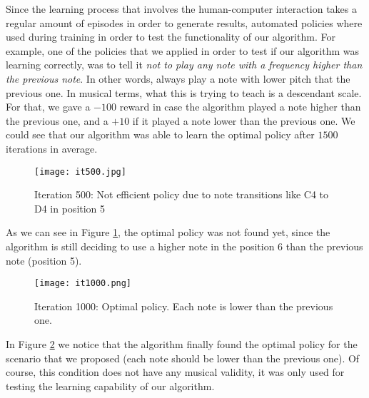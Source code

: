 Since the learning process that involves the human-computer interaction takes a regular amount of episodes in order to generate results, automated policies where used during training in order to test the functionality of our algorithm. For example, one of the policies that we applied in order to test if our algorithm was learning correctly, was to tell it \emph{not to play any note with a frequency higher than the previous note}. In other words, always play a note with lower pitch that the previous one. In musical terms, what this is trying to teach is a descendant scale. For that, we gave a $ -100 $ reward in case the algorithm played a note higher than the previous one, and a $ +10 $ if it played a note lower than the previous one. We could see that our algorithm was able to learn the optimal policy after $ 1500 $ iterations in average.

\begin{figure}[h]
  \texttt{[image: it500.jpg]}
  \caption{Iteration 500: Not efficient policy due to note transitions like C4 to D4 in position 5}
  \label{fig:it500}
\end{figure}

As we can see in Figure \ref{fig:it500}, the optimal policy was not found yet, since the algorithm is still deciding to use a higher note in the position 6 than the previous note (position 5).

\begin{figure}[ht]
  \texttt{[image: it1000.png]}
  \caption{Iteration 1000: Optimal policy. Each note is lower than the previous one.}
  \label{fig:it1000}
\end{figure}

In Figure \ref{fig:it1000} we notice that the algorithm finally found the optimal policy for the scenario that we proposed (each note should be lower than the previous one). Of course, this condition does not have any musical validity, it was only used for testing the learning capability of our algorithm.

